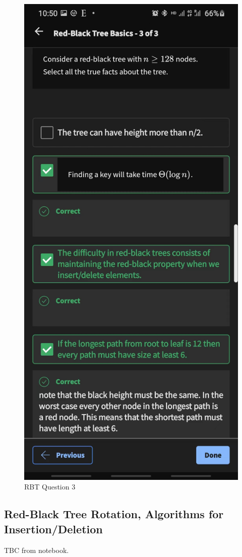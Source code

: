 \documentclass{article}
\begin{document}
\begin{figure}[H]
    \includegraphics[width=\textwidth]{rbtquiz03.jpg}
    \caption{RBT Question 3}
\end{figure}


\subsection{Red-Black Tree Rotation, Algorithms for Insertion/Deletion}

TBC from notebook.
\end{document}
